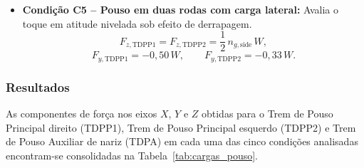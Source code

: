 \begin{itemize}
    \item \textbf{Condição C5 -- Pouso em duas rodas com carga lateral:} Avalia o toque em atitude nivelada sob efeito de derrapagem.
    \begin{equation}
        F_{z,\text{TDPP1}} = F_{z,\text{TDPP2}} = \frac{1}{2} \, n_{g,\text{side}} \, W,
        \label{eq:c5_z}
    \end{equation}
    \begin{equation}
        F_{y,\text{TDPP1}} = -0,50 \, W, \qquad F_{y,\text{TDPP2}} = -0,33 \, W.
        \label{eq:c5_y}
    \end{equation}
\end{itemize}

\subsubsection*{Resultados}

As componentes de força nos eixos $X$, $Y$ e $Z$ obtidas para o Trem de Pouso Principal direito (TDPP1), Trem de Pouso Principal esquerdo (TDPP2) e Trem de Pouso Auxiliar de nariz (TDPA) em cada uma das cinco condições analisadas encontram-se consolidadas na Tabela~\ref{tab:cargas_pouso}.

\begin{table}[H]
\centering
\caption{Cargas limite atuantes no trem de pouso por condição de operação.}
\label{tab:cargas_pouso}
\setlength{\tabcolsep}{4.5pt}
\renewcommand{\arraystretch}{1.2}
\end{table}

